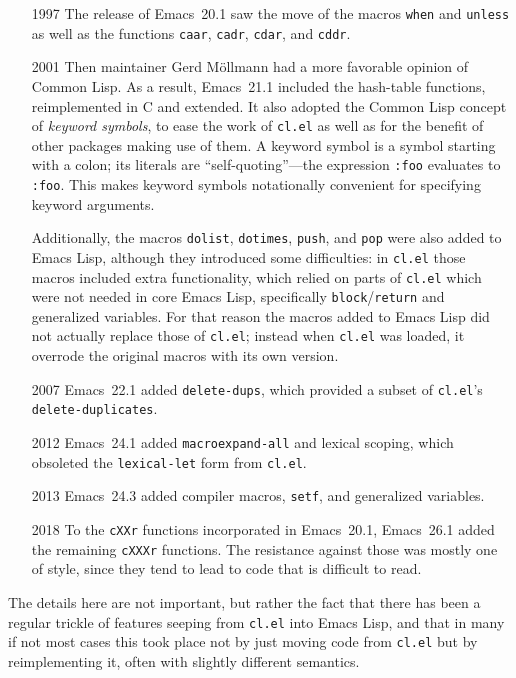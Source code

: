 \documentclass[format=acmsmall,screen]{acmart}
\newcommand \Elisp {Emacs Lisp}
\begin{document}
\begin{itemize}
\item[1997] The release of Emacs~20.1 saw the move of the
  macros \texttt{when} and \texttt{unless} as well as the functions
  \texttt{caar}, \texttt{cadr}, \texttt{cdar}, and \texttt{cddr}.
\item[2001] Then maintainer Gerd Möllmann had a more favorable opinion of
  Common Lisp.  As a result, Emacs~21.1 included the hash-table functions,
  reimplemented in C and extended.  It also adopted the Common Lisp concept
  of \textit{keyword symbols}, to ease the work of \texttt{cl.el} as well as
  for the benefit of other packages making use of them.  A keyword
  symbol is a symbol starting with a colon; its literals are
  ``self-quoting''---the expression \texttt{:foo} evaluates to \texttt{:foo}.  This
  makes keyword symbols notationally convenient for specifying keyword arguments.

  Additionally, the
  macros \texttt{dolist}, \texttt{dotimes}, \texttt{push}, and \texttt{pop}
  were also added to \Elisp{}, although they introduced some difficulties: in
  \texttt{cl.el} those macros included extra functionality, which relied on
  parts of \texttt{cl.el} which were not needed in core \Elisp, specifically
  \texttt{block}/\texttt{return} and generalized variables.  For that reason
  the macros added to \Elisp{} did not actually replace those of
  \texttt{cl.el}; instead when \texttt{cl.el} was loaded, it overrode the
  original macros with its own version.
\item[2007] Emacs~22.1 added \texttt{delete-dups}, which provided a subset of
  \texttt{cl.el}'s \texttt{delete-duplicates}.
\item[2012] Emacs~24.1 added \texttt{macroexpand-all} and lexical scoping,
  which obsoleted  the  \texttt{lexical-let} form from \texttt{cl.el}.
\item[2013] Emacs~24.3 added compiler macros, \texttt{setf}, and
  generalized variables.
\item[2018] To the \texttt{cXXr} functions incorporated in Emacs~20.1,
  Emacs~26.1 added the remaining \texttt{cXXXr} functions.  The resistance
  against those was mostly one of style, since they tend to lead to code
  that is difficult to read.
\end{itemize}
The details here are not important, but rather the fact that there
has been a regular trickle of features seeping from \texttt{cl.el} into
\Elisp{}, and that in many if not most cases this took place not by just
moving code from \texttt{cl.el} but by reimplementing it, often with
slightly different semantics.
\end{document}
